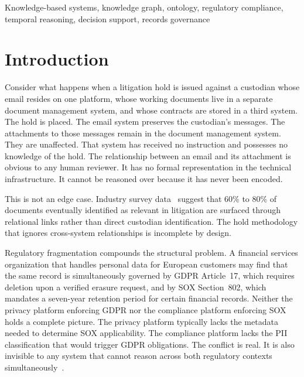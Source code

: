 \documentclass{ieeeaccess}
\begin{document}
\begin{keywords}
Knowledge-based systems, knowledge graph, ontology, regulatory compliance, temporal reasoning, decision support, records governance
\end{keywords}

\section{Introduction}

Consider what happens when a litigation hold is issued against a custodian whose email resides on one platform, whose working documents live in a separate document management system, and whose contracts are stored in a third system. The hold is placed. The email system preserves the custodian's messages. The attachments to those messages remain in the document management system. They are unaffected. That system has received no instruction and possesses no knowledge of the hold. The relationship between an email and its attachment is obvious to any human reviewer. It has no formal representation in the technical infrastructure. It cannot be reasoned over because it has never been encoded.

This is not an edge case. Industry survey data~\cite{sedona2019} suggest that 60\% to 80\% of documents eventually identified as relevant in litigation are surfaced through relational links rather than direct custodian identification. The hold methodology that ignores cross-system relationships is incomplete by design.

Regulatory fragmentation compounds the structural problem. A financial services organization that handles personal data for European customers may find that the same record is simultaneously governed by GDPR Article~17, which requires deletion upon a verified erasure request, and by SOX Section~802, which mandates a seven-year retention period for certain financial records. Neither the privacy platform enforcing GDPR nor the compliance platform enforcing SOX holds a complete picture. The privacy platform typically lacks the metadata needed to determine SOX applicability. The compliance platform lacks the PII classification that would trigger GDPR obligations. The conflict is real. It is also invisible to any system that cannot reason across both regulatory contexts simultaneously~\cite{edrm,iso15489}.
\end{document}
